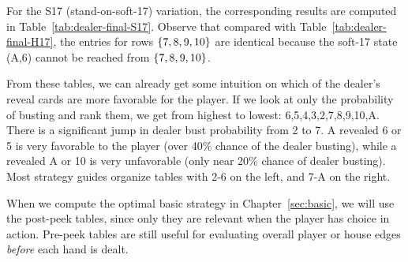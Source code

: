 For the S17 (stand-on-soft-17) variation, the corresponding results are
computed in Table~\ref{tab:dealer-final-S17}.
Observe that compared with Table~\ref{tab:dealer-final-H17},
the entries for rows $\left\{7,8,9,10\right\}$ are identical because the
soft-17 state (A,6) cannot be reached from $\left\{7,8,9,10\right\}$.

From these tables, we can already get some intuition on
which of the dealer's reveal cards are more favorable for the player.
If we look at only the probability of busting and rank them, 
we get from highest to lowest: 6,5,4,3,2,7,8,9,10,A.
There is a significant jump in dealer bust probability from 2 to 7.  
A revealed 6 or 5 is very favorable to the player (over 40\% chance of 
the dealer busting), 
while a revealed A or 10 is very unfavorable 
(only near 20\% chance of dealer busting).
Most strategy guides organize tables with 2-6 on the left, 
and 7-A on the right.


When we compute the optimal basic strategy in Chapter~\ref{sec:basic}, 
we will use the post-peek tables, since only they are relevant
when the player has choice in action.  
Pre-peek tables are still useful for evaluating overall player or house
edges \emph{before} each hand is dealt.

